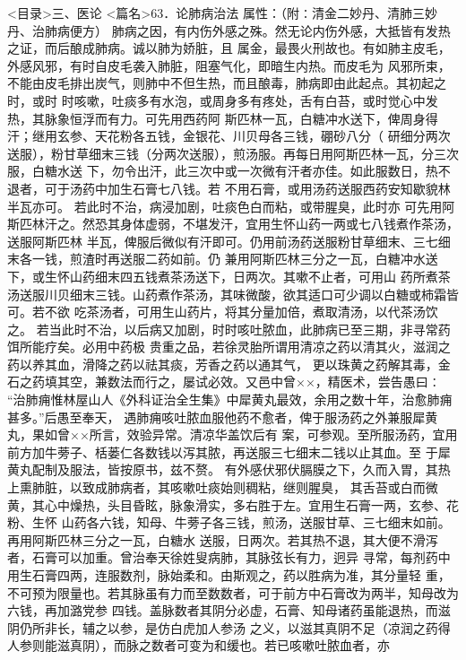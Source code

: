 \documentclass[a4paper,12pt,UTF8,twoside]{ctexbook}
\begin{document}
<目录>三、医论
<篇名>63．论肺病治法
属性：（附∶清金二妙丹、清肺三妙丹、治肺病便方） 
肺病之因，有内伤外感之殊。然无论内伤外感，大抵皆有发热之证，而后酿成肺病。诚以肺为娇脏，且 
属金，最畏火刑故也。有如肺主皮毛，外感风邪，有时自皮毛袭入肺脏，阻塞气化，即暗生内热。而皮毛为 
风邪所束，不能由皮毛排出炭气，则肺中不但生热，而且酿毒，肺病即由此起点。其初起之时，或时 
时咳嗽，吐痰多有水泡，或周身多有疼处，舌有白苔，或时觉心中发热，其脉象恒浮而有力。可先用西药阿 
斯匹林一瓦，白糖冲水送下，俾周身得汗；继用玄参、天花粉各五钱，金银花、川贝母各三钱，硼砂八分（ 
研细分两次送服），粉甘草细末三钱（分两次送服），煎汤服。再每日用阿斯匹林一瓦，分三次服，白糖水送 
下，勿令出汗，此三次中或一次微有汗者亦佳。如此服数日，热不退者，可于汤药中加生石膏七八钱。若 
不用石膏，或用汤药送服西药安知歇貌林半瓦亦可。 
若此时不治，病浸加剧，吐痰色白而粘，或带腥臭，此时亦 
可先用阿斯匹林汗之。然恐其身体虚弱，不堪发汗，宜用生怀山药一两或七八钱煮作茶汤，送服阿斯匹林 
半瓦，俾服后微似有汗即可。仍用前汤药送服粉甘草细末、三七细末各一钱，煎渣时再送服二药如前。仍 
兼用阿斯匹林三分之一瓦，白糖冲水送下，或生怀山药细末四五钱煮茶汤送下，日两次。其嗽不止者，可用山 
药所煮茶汤送服川贝细末三钱。山药煮作茶汤，其味微酸，欲其适口可少调以白糖或柿霜皆可。若不欲 
吃茶汤者，可用生山药片，将其分量加倍，煮取清汤，以代茶汤饮之。 
若当此时不治，以后病又加剧，时时咳吐脓血，此肺病已至三期，非寻常药饵所能疗矣。必用中药极 
贵重之品，若徐灵胎所谓用清凉之药以清其火，滋润之药以养其血，滑降之药以祛其痰，芳香之药以通其气， 
更以珠黄之药解其毒，金石之药填其空，兼数法而行之，屡试必效。又邑中曾××，精医术，尝告愚曰∶ 
“治肺痈惟林屋山人《外科证治全生集》中犀黄丸最效，余用之数十年，治愈肺痈甚多。”后愚至奉天， 
遇肺痈咳吐脓血服他药不愈者，俾于服汤药之外兼服犀黄丸，果如曾××所言，效验异常。清凉华盖饮后有 
案，可参观。至所服汤药，宜用前方加牛蒡子、栝蒌仁各数钱以泻其脓，再送服三七细末二钱以止其血。至 
于犀黄丸配制及服法，皆按原书，兹不赘。 
有外感伏邪伏膈膜之下，久而入胃，其热上熏肺脏，以致成肺病者，其咳嗽吐痰始则稠粘，继则腥臭， 
其舌苔或白而微黄，其心中燥热，头目昏眩，脉象滑实，多右胜于左。宜用生石膏一两，玄参、花粉、生怀 
山药各六钱，知母、牛蒡子各三钱，煎汤，送服甘草、三七细末如前。再用阿斯匹林三分之一瓦，白糖水 
送服，日两次。若其热不退，其大便不滑泻者，石膏可以加重。曾治奉天徐姓叟病肺，其脉弦长有力，迥异 
寻常，每剂药中用生石膏四两，连服数剂，脉始柔和。由斯观之，药以胜病为准，其分量轻 
重，不可预为限量也。若其脉虽有力而至数数者，可于前方中石膏改为两半，知母改为六钱，再加潞党参 
四钱。盖脉数者其阴分必虚，石膏、知母诸药虽能退热，而滋阴仍所非长，辅之以参，是仿白虎加人参汤 
之义，以滋其真阴不足（凉润之药得人参则能滋真阴），而脉之数者可变为和缓也。若已咳嗽吐脓血者，亦 
\end{document}
